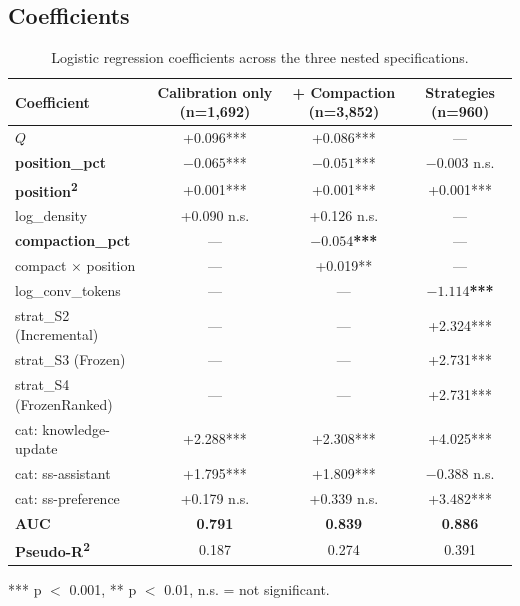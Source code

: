 \subsection{Coefficients}
\label{sec:coefficients}

\begin{table}[h]
\centering
\caption{Logistic regression coefficients across the three nested specifications.}
\label{tab:coefficients}
\small
\begin{tabular}{lccc}
\toprule
Coefficient & Calibration only (n=1{,}692) & + Compaction (n=3{,}852) & Strategies (n=960) \\
\midrule
\textbf{$Q$}                       & +0.096*** & +0.086*** & --- \\
\textbf{position\_pct}             & $-0.065$*** & $-0.051$*** & $-0.003$ n.s. \\
\textbf{position\textsuperscript{2}} & +0.001*** & +0.001*** & +0.001*** \\
log\_density                       & +0.090 n.s. & +0.126 n.s. & --- \\
\textbf{compaction\_pct}           & ---       & \textbf{$-0.054$***} & --- \\
compact $\times$ position          & ---       & +0.019**  & --- \\
log\_conv\_tokens                  & ---       & ---       & \textbf{$-1.114$***} \\
strat\_S2 (Incremental)            & ---       & ---       & +2.324*** \\
strat\_S3 (Frozen)                 & ---       & ---       & +2.731*** \\
strat\_S4 (FrozenRanked)           & ---       & ---       & +2.731*** \\
cat: knowledge-update              & +2.288*** & +2.308*** & +4.025*** \\
cat: ss-assistant                  & +1.795*** & +1.809*** & $-0.388$ n.s. \\
cat: ss-preference                 & +0.179 n.s. & +0.339 n.s. & +3.482*** \\
\midrule
\textbf{AUC}                       & \textbf{0.791} & \textbf{0.839} & \textbf{0.886} \\
\textbf{Pseudo-R\textsuperscript{2}} & 0.187 & 0.274 & 0.391 \\
\bottomrule
\end{tabular}
\end{table}

*** p $<$ 0.001, ** p $<$ 0.01, n.s. = not significant.

